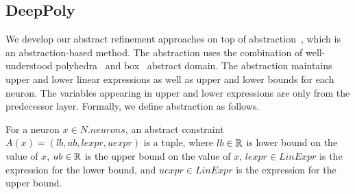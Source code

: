 \subsection{DeepPoly}
\label{sec:deeppoly}
We develop our abstract refinement approaches on top of \deeppoly{} abstraction~\cite{singh2019abstract}, 
which is an abstraction-based method. The abstraction uses the combination of
well-understood polyhedra~\cite{cousot1978automatic} and box~\cite{cousot1977abstract} abstract domain.
The abstraction maintains upper and lower linear expressions as well as upper and lower bounds for each neuron.
The variables appearing in upper and lower expressions are only from the predecessor layer.
Formally, we define abstraction as follows. 

\begin{df}
    For a neuron $x \in N.neurons$,
    an abstract constraint $A(x) = (lb,ub, lexpr, uexpr)$ is a tuple, where
    $lb \in \mathbb{R}$ is lower bound on the value of $x$,
    $ub \in \mathbb{R}$ is the upper bound on the value of  $x$,
    $lexpr \in LinExpr$ is the expression for the lower bound, and
    $uexpr \in LinExpr$ is the expression for the upper bound.
\end{df}


